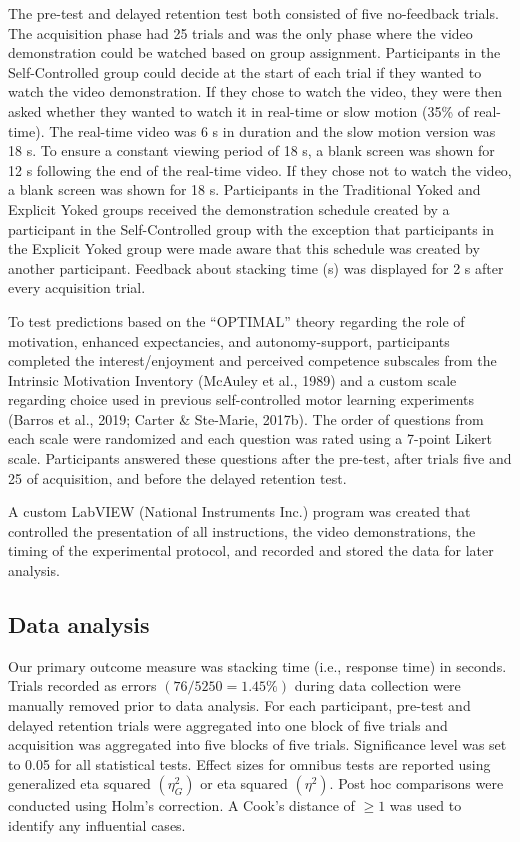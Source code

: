\documentclass[
  english,
  jou]{apa7}
\begin{document}
The pre-test and delayed retention test both consisted of five no-feedback trials. The acquisition phase had 25 trials and was the only phase where the video demonstration could be watched based on group assignment. Participants in the Self-Controlled group could decide at the start of each trial if they wanted to watch the video demonstration. If they chose to watch the video, they were then asked whether they wanted to watch it in real-time or slow motion (35\% of real-time). The real-time video was 6 s in duration and the slow motion version was 18 s. To ensure a constant viewing period of 18 s, a blank screen was shown for 12 s following the end of the real-time video. If they chose not to watch the video, a blank screen was shown for 18 s. Participants in the Traditional Yoked and Explicit Yoked groups received the demonstration schedule created by a participant in the Self-Controlled group with the exception that participants in the Explicit Yoked group were made aware that this schedule was created by another participant. Feedback about stacking time (s) was displayed for 2 s after every acquisition trial.

To test predictions based on the ``OPTIMAL'' theory regarding the role of motivation, enhanced expectancies, and autonomy-support, participants completed the interest/enjoyment and perceived competence subscales from the Intrinsic Motivation Inventory (McAuley et al., 1989) and a custom scale regarding choice used in previous self-controlled motor learning experiments (Barros et al., 2019; Carter \& Ste-Marie, 2017b). The order of questions from each scale were randomized and each question was rated using a 7-point Likert scale. Participants answered these questions after the pre-test, after trials five and 25 of acquisition, and before the delayed retention test.

A custom LabVIEW (National Instruments Inc.) program was created that controlled the presentation of all instructions, the video demonstrations, the timing of the experimental protocol, and recorded and stored the data for later analysis.

\hypertarget{data-analysis}{%
\subsection{Data analysis}\label{data-analysis}}

Our primary outcome measure was stacking time (i.e., response time) in seconds. Trials recorded as errors \((76/5250 = 1.45\%)\) during data collection were manually removed prior to data analysis. For each participant, pre-test and delayed retention trials were aggregated into one block of five trials and acquisition was aggregated into five blocks of five trials. Significance level was set to 0.05 for all statistical tests. Effect sizes for omnibus tests are reported using generalized eta squared \((\eta^2_{G})\) or eta squared \((\eta^2)\). Post hoc comparisons were conducted using Holm's correction. A Cook's distance of \(\geq 1\) was used to identify any influential cases.
\end{document}
